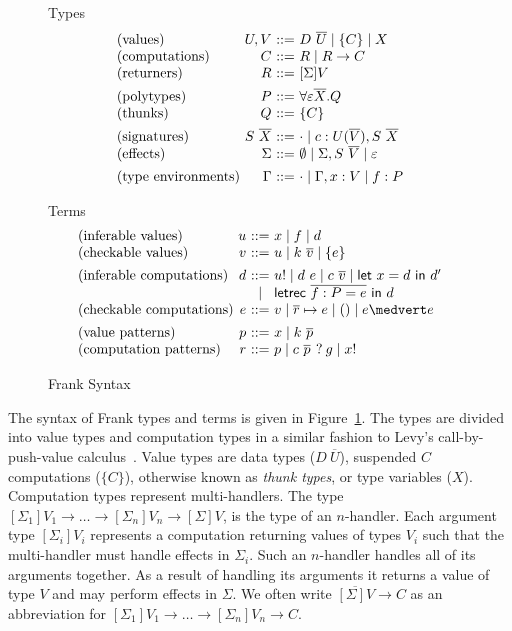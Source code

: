 \documentclass[preprint]{sigplanconf}
\makeatletter
\newcommand{\many}{\overline}
\newcommand\ba{\begin{array}}
\newcommand\ea{\end{array}}
\newenvironment{syntax}{\[\ba{@{}l@{~}r@{~}c@{~}l@{}}}{\ea\]}
\newcommand{\sig}{S}
\newcommand{\sigs}{\Sigma}
\newcommand{\effbox}[1]{[#1]}
\newcommand{\key}[1]{\mathsf{#1}}
\newcommand{\handleSymbol}{\mathbin{?}}
\newcommand{\handle}[2]{{#1} \handleSymbol {#2}}
\newcommand{\thunk}[1]{\{{#1}\}}
\newcommand{\force}[1]{{#1}!}
\newcommand\slab[1]{(\textrm{#1})}
\makeatother
\begin{document}
\begin{figure}
Types
\begin{syntax}
\slab{values}       &U, V          &::=& D~\many{U} \mid \thunk{C} \mid X \\
\slab{computations} &C             &::=& R \mid R \to C \\
\slab{returners}    &R             &::=& \effbox{\sigs}V
\\[1ex]
\slab{polytypes}    &P             &::=& \forall \varepsilon \many{X}.Q \\
\slab{thunks}       &Q             &::=& \thunk{C}
\\[1ex]
\slab{signatures}   &\sig~\many{X} &::=& \cdot \mid c : U(\many{V}), \sig~\many{X} \\
\slab{effects}      &\sigs  &::=&
  \emptyset \mid \sigs, \sig~\many{V} \mid \varepsilon
\\[1ex]
\slab{type environments}     &\Gamma        &::=& \cdot \mid \Gamma, x:V \mid f:P \\
\end{syntax}

Terms
\begin{syntax}
\slab{inferable values}&u       &::=& x \mid f \mid d                                \\
\slab{checkable values}&v        &::=& u \mid k~\many{v} \mid \thunk{e}
\\[1ex]
\slab{inferable computations}&d &::=& \force{u} \mid d~e \mid c~\many{v}
                               \mid  \key{let}~x=d~\key{in}~d' \\
                             &&\mid& \key{letrec}~\many{f : P = e}~\key{in}~d \\
\slab{checkable computations} &e &::=& v \mid \many{r} \mapsto e \mid () \mid e \medvert e
\\[1ex]
\slab{value patterns}&p       &::=& x \mid k~\many{p}                              \\
\slab{computation patterns}&r &::=& p \mid \handle{c~\many{p}\,}{g} \mid \force{x} \\
\end{syntax}

\caption{Frank Syntax}
\label{fig:frank-syntax}
\end{figure}

The syntax of Frank types and terms is given in
Figure~\ref{fig:frank-syntax}. The types are divided into value types
and computation types in a similar fashion to Levy's
call-by-push-value calculus~\cite{Levy2004}.
%
Value types are data types ($D~\many{U}$), suspended $C$ computations
($\thunk{C}$), otherwise known as \emph{thunk types}, or type
variables ($X$).
%
Computation types represent multi-handlers. The type
$\effbox{\sigs_1}V_1 \to \dots \to \effbox{\sigs_n}V_n \to \effbox{\sigs}V$,
%
is the type of an $n$-handler. Each argument type
$\effbox{\sigs_i}V_i$ represents a computation returning values of
types $V_i$ such that the multi-handler must handle effects in
$\sigs_i$. Such an $n$-handler handles all of its arguments
together. As a result of handling its arguments it returns a value of
type $V$ and may perform effects in $\sigs$.
%
We often write $\many{\effbox{\sigs}V} \to C$ as an abbreviation for
$\effbox{\sigs_1}V_1 \to \dots \to \effbox{\sigs_n}V_n \to C$.
\end{document}
